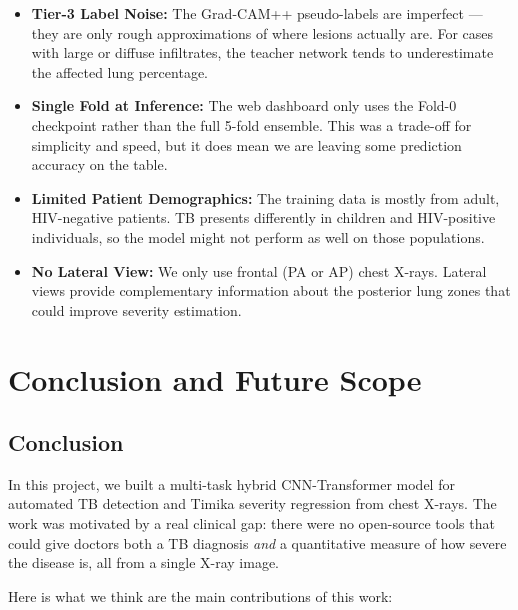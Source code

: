 \documentclass[12pt]{report}
\begin{document}
\begin{itemize}
    \item \textbf{Tier-3 Label Noise:} The Grad-CAM++ pseudo-labels are imperfect --- they are only rough approximations of where lesions actually are. For cases with large or diffuse infiltrates, the teacher network tends to underestimate the affected lung percentage.

    \item \textbf{Single Fold at Inference:} The web dashboard only uses the Fold-0 checkpoint rather than the full 5-fold ensemble. This was a trade-off for simplicity and speed, but it does mean we are leaving some prediction accuracy on the table.

    \item \textbf{Limited Patient Demographics:} The training data is mostly from adult, HIV-negative patients. TB presents differently in children and HIV-positive individuals, so the model might not perform as well on those populations.

    \item \textbf{No Lateral View:} We only use frontal (PA or AP) chest X-rays. Lateral views provide complementary information about the posterior lung zones that could improve severity estimation.
\end{itemize}

\chapter{Conclusion and Future Scope}
\doublespacing

\section{Conclusion}

In this project, we built a multi-task hybrid CNN-Transformer model for automated TB detection and Timika severity regression from chest X-rays. The work was motivated by a real clinical gap: there were no open-source tools that could give doctors both a TB diagnosis \textit{and} a quantitative measure of how severe the disease is, all from a single X-ray image.

Here is what we think are the main contributions of this work:
\end{document}
